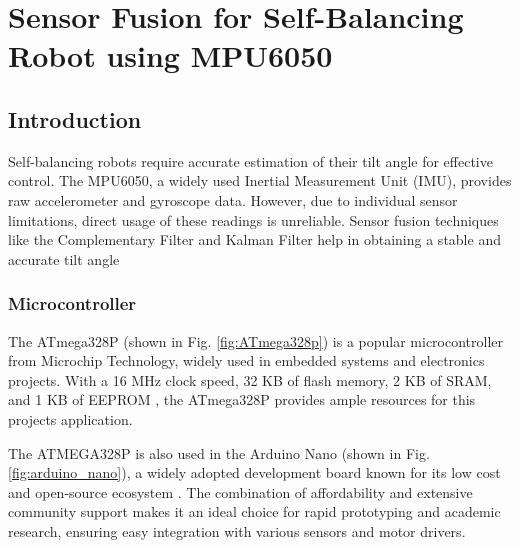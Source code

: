 \section{Sensor Fusion for Self-Balancing Robot using MPU6050}
\subsection{Introduction}
Self-balancing robots require accurate estimation of their tilt angle for effective control. The MPU6050, a widely used Inertial Measurement Unit (IMU), provides raw accelerometer and gyroscope data. However, due to individual sensor limitations, direct usage of these readings is unreliable. Sensor fusion techniques like the Complementary Filter and Kalman Filter help in obtaining a stable and accurate tilt angle

\subsubsection{Microcontroller}
The ATmega328P (shown in Fig. \ref{fig:ATmega328p}) is a popular microcontroller from Microchip Technology, widely used in embedded systems and electronics projects. With a 16 MHz clock speed, 32 KB of flash memory, 2 KB of SRAM, and 1 KB of EEPROM \cite{atmega_microchip}, the ATmega328P provides ample resources for this projects application. 

The ATMEGA328P is also used in the Arduino Nano (shown in Fig. \ref{fig:arduino_nano}), a widely adopted development board known for its low cost and open-source ecosystem \cite{arduino_nano}. The combination of affordability and extensive community support makes it an ideal choice for rapid prototyping and academic research, ensuring easy integration with various sensors and motor drivers. 

\begin{figure}[H]
	\centering
	\qquad
	\label{fig:ATmega328p_and_arduino_nano}
	\caption{}
\end{figure}

